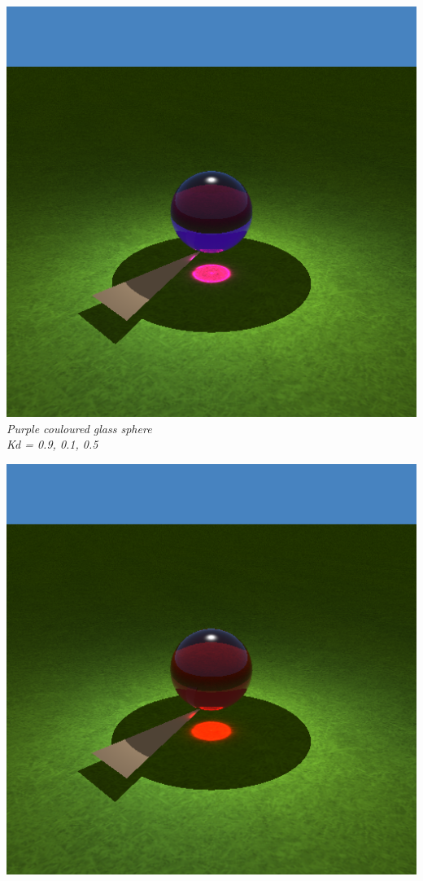 \documentclass[a4,12pt]{article}
\begin{document}
	\begin{center}
		\begin{minipage}[b]{0.40\linewidth}
			\begin{center}
				\includegraphics[width = \textwidth]{./Worksheet8/pinkball.png}\\
				\textit{Purple couloured glass sphere\\Kd = 0.9, 0.1, 0.5}\\
			\end{center}
		\end{minipage}
		\hspace{0.05\linewidth}
		\begin{minipage}[b]{0.40\linewidth}
			\begin{center}
				\includegraphics[width = \textwidth]{./Worksheet8/redball.png}\\

\end{center}
\end{minipage}
\end{center}
\end{document}
